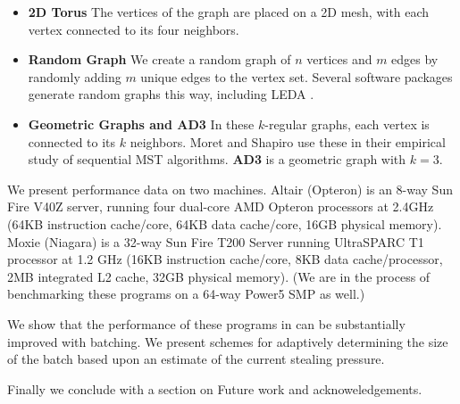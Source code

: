 \begin{itemize}
\itemsep0pt
\item \textbf{2D Torus} The vertices of the graph are placed on a 2D
  mesh, with each vertex connected to its four neighbors.  

\item \textbf{Random Graph} We create a random graph of $n$ vertices
  and $m$ edges by randomly adding $m$ unique edges to the vertex
  set. Several software packages generate random graphs this way,
  including LEDA \cite{MN99}.
  
\item \textbf{Geometric Graphs and AD3} In these $k$-regular graphs,
  each vertex is connected to its $k$ %
  neighbors.  Moret and Shapiro \cite{MS94} use these
  in their empirical study of sequential MST algorithms. \textbf{AD3}
  is a geometric graph with $k=3$.  
\end{itemize}

We present performance data on two machines. Altair (Opteron) is an
8-way Sun Fire V40Z server, running four dual-core AMD Opteron
processors at 2.4GHz (64KB instruction cache/core, 64KB data
cache/core, 16GB physical memory). Moxie (Niagara) is a 32-way Sun
Fire T200 Server running UltraSPARC T1 processor at 1.2 GHz (16KB
instruction cache/core, 8KB data cache/processor, 2MB integrated L2
cache, 32GB physical memory). (We are in the process of benchmarking
these programs on a 64-way Power5 SMP as well.)


We show that the performance of these programs in \XWS{} can be
substantially improved with batching. We present schemes for
adaptively determining the size of the batch based upon an estimate of
the current stealing pressure.

Finally we conclude with a section on Future work and acknoweledgements.